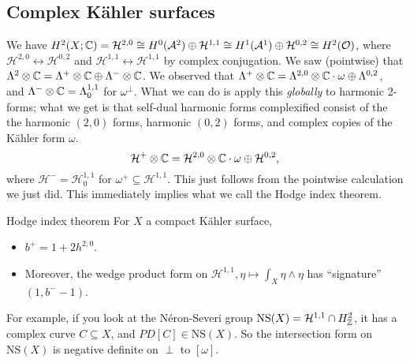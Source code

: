 \subsection{Complex K\"ahler surfaces}
We have $H^2 (X;\mathbb{C} ) = \mathcal H ^{2,0}\cong  H^0(\mathcal A^2)\oplus \mathcal H ^{1,1}\cong  H^1(\mathcal A^1) \oplus \mathcal H^{0,2}\cong  H^2 (\mathcal O)$, where $\mathcal H^{2,0}\leftrightarrow \mathcal H^{0,2}$ and $\mathcal H^{1,1}\leftrightarrow \mathcal H^{1,1}$ by complex conjugation. We saw (pointwise) that $\Lambda^2 \otimes \mathbb{C} = \Lambda^+ \otimes \mathbb{C} \oplus \Lambda^- \otimes \mathbb{C}$. We observed that $\Lambda^+ \otimes \mathbb{C} = \Lambda^{2,0}\otimes \mathbb{C} \cdot \omega \oplus \Lambda^{0,2}$, and $\Lambda^- \otimes \mathbb{C} = \Lambda^{1,1}_0$ for $\omega ^{\perp}$. What we can do is apply this \emph{globally} to harmonic 2-forms; what we get is that self-dual harmonic forms complexified consist of the the harmonic $(2,0)$ forms, harmonic $(0,2)$ forms, and complex copies of the K\"ahler form $\omega$. \[
\mathcal H^+ \otimes \mathbb{C} = \mathcal H ^{2,0}\otimes \mathbb{C} \cdot  \omega \oplus \mathcal H ^{0,2},
\] where $\mathcal H^- = \mathcal H ^{1,1}_0$ for $\omega ^+ \subseteq \mathcal H ^{1,1}$. This just follows from the pointwise calculation we just did. This immediately implies what we call the Hodge index theorem.
\begin{namedthm}{Hodge index theorem} 
   For $X$ a compact K\"ahler surface, 
   \begin{itemize}
   \setlength\itemsep{-.2em}
       \item $b^+ = 1 + 2 h ^{2,0}$. 
       \item Moreover, the wedge product form on $\mathcal H^{1,1}, \eta \mapsto  \int _X \eta \wedge \eta$ has ``signature'' $(1, b^- -1)$.
   \end{itemize}
\end{namedthm}
For example, if you look at the N\'eron-Severi group $\mathrm{NS}(X) = \mathcal H ^{1,1} \cap  H^2_{\mathbb{Z}}$, it has a complex curve $C \subseteq X$, and $PD[C] \in  \mathrm{NS}(X)$. So the intersection form on $\mathrm{NS}(X)$ is negative definite on $\perp $ to $[\omega]$.

